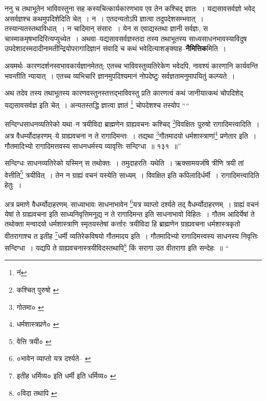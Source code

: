 \documentclass[article,12pt,a4paper]{memoir}
\begin{document}
	  \pstart ननु च तथाभूतेन भाविवस्तुना सह कस्यचित्कार्यकारणभाव एव तेन कश्चिद् ज्ञातः । यद्य\leavevmode{}सावसर्वज्ञो भवेद् असर्वज्ञश्च कथमुपदिशेदिति चेत् । न । एतदन्यतोऽपि ज्ञात्वा तदुपदेशसम्भवात् । तस्यान्यतस्तथाविधात् । न चादिमान् संसारः । येन स एवाद्यस्तथा ज्ञानी सर्वज्ञः, स चास्माकमृषभादिरित्यप्युच्येत । अथवा--यद्यसावसर्वज्ञस्तदा तस्य तथाभूतस्य साध्यसाधनभावस्याविदुष उपदेशादस्मदादीनामतीन्द्रियोपरागादिज्ञानं संवादि च कथं भवेदित्याशङ्क्याह--\textbf{नैमित्तिक}मिति ।
	\pend
      

	  \pstart अयमर्थः--कारणदर्शनस्वभावकार्यज्ञानमेतत्; एतच्च भाविवस्तुव्यतिरेकेण भवेदपि, नावश्यं कारणानि कार्यवन्ति भवन्तीति न्यायात् । एतच्च व्यभिचारि ज्ञानमुपदिश्यमानं नोपदेष्टुः सर्वज्ञतामनुमापयितुं कल्प्यते ।
	\pend
      

	  \pstart अथ तदेव तस्य तथाभूतस्य कारणवस्तुनस्तत्तद्भाविवस्तु प्रति कारणत्वं कथं जानीयात्कथं चोपदिशेद् यद्यसावसर्वज्ञ इति चेत् । अन्यतस्तद्धि ज्ञात्वा ज्ञातं \footnote{नं} चोपदेशश्च तस्योप  \leavevmode{} ““
	  
	सन्दिग्धसाधनव्यतिरेको यथा--न त्रयीविदा ब्राह्मणेन ग्राह्यवचनः कश्चिद् \footnote{कश्चित् पुरुषो \cite{dp-msB} \cite{dp-edP} \cite{dp-edH} \cite{dp-edE}}विवक्षितः पुरुषो रागादिमत्त्वादिति । अत्र वैधर्म्योदाहरणम्--ये ग्राह्यवचना न ते रागादिमन्तः । तद्यथा \footnote{गोतमा० \cite{dp-msD}}गौतमादयो धर्मशास्त्राणां\footnote{धर्मशास्त्रप्रणे० \cite{dp-msC}} प्रणेतार इति । गौतमादिभ्यो रागादिमत्तवस्य साधनधर्मस्य व्यावृत्तिः सन्दिग्धा ॥ १३१ ॥” 
	  
	सन्दिग्धः साधनव्यतिरेको यस्मिन् स तथोक्तः । तमुदाहरति--यथेति । ऋक्सामयजंषि त्रीणि त्रयी तां वेत्तीति\footnote{वेत्ति त्रयी० \cite{dp-msA} \cite{dp-msB} \cite{dp-msD} \cite{dp-edP} \cite{dp-edH} \cite{dp-edE} \cite{dp-edN}} त्रयीवित् । तेन न ग्राह्यं वचनं यस्येति साध्यम् । विवक्षित इति कपिलादिर्धर्मी । रागादिमत्त्वादिति हेतुः । 
	  
	अत्र प्रमाणे वैधर्म्योदाहरणम्--साध्याभावः साधनाभावेन \footnote{०भावेन व्याप्तो यत्र दर्श्यते--\cite{dp-msA} \cite{dp-edP} \cite{dp-edH} \cite{dp-edE}}यत्र व्याप्तो दर्श्यते तद् वैधर्म्योदाहरणम् । ग्राह्यं वचनं येषां ते ग्राह्यवचना इति साध्यनिवृत्तिमनूद्य न ते रागादिमन्त इति साधनाभावो विहितः । गौतम आदिर्येषां ते तथोक्ता मन्वादयो धर्मशास्त्राणि स्मृतयस्तेषां कर्त्तारः त्रयीविदा हि ब्राह्मणेन ग्राह्यवचना धर्मशास्त्रकृतो वीतरागाश्च त इतीह \footnote{इतीह धर्मिव्य० \cite{dp-msC} \cite{dp-msD} इति धर्मी \cite{dp-msA} \cite{dp-edP} \cite{dp-edH} \cite{dp-edN} इति धर्मिव्य० \cite{dp-edE}}धर्मी व्यतिरेकविषयो गौतमादय इति । गौतमादिभ्यो रागादिमत्त्वस्य साधनस्य निवृत्तिः सन्दिग्धा । यद्यपि ते ग्राह्यवचनास्त्रयीविदस्तथापि\footnote{०विदा तथापि \cite{dp-msA} \cite{dp-edP} \cite{dp-edH} \cite{dp-edE} \cite{dp-edN}} किं सरागा उत वीतरागा इति सन्देहः ॥ “
	  
\end{document}
